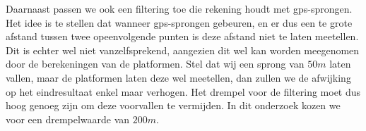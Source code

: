 Daarnaast passen we ook een filtering toe die rekening houdt met
\ac{gps}-sprongen. Het idee is te stellen dat wanneer \ac{gps}-sprongen
gebeuren, en er dus een te grote afstand tussen twee opeenvolgende punten is
deze afstand niet te laten meetellen. Dit is echter wel niet vanzelfsprekend,
aangezien dit wel kan worden meegenomen door de berekeningen van de platformen.
Stel dat wij een sprong van $50m$ laten vallen, maar de platformen laten deze
wel meetellen, dan zullen we de afwijking op het eindresultaat enkel maar
verhogen. Het drempel voor de filtering moet dus hoog genoeg zijn om deze
voorvallen te vermijden. In dit onderzoek kozen we voor een drempelwaarde van
$200m$.

